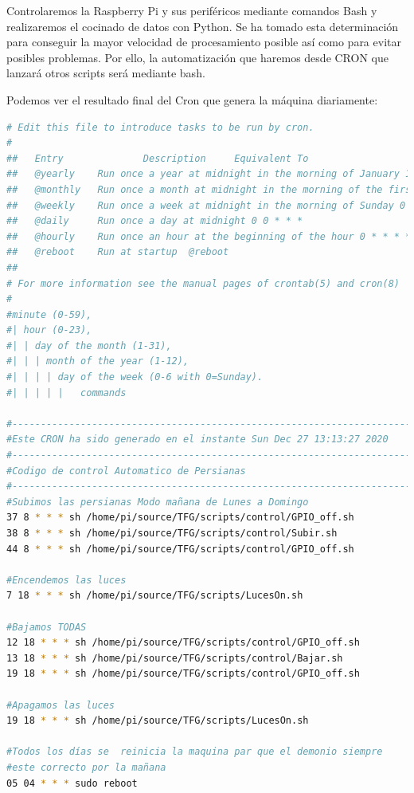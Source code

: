 Controlaremos la Raspberry Pi y sus periféricos mediante comandos Bash y realizaremos el cocinado de datos con Python. Se ha tomado esta determinación para conseguir la mayor velocidad de procesamiento posible así como para evitar posibles problemas. Por ello, la automatización que haremos desde CRON que lanzará otros scripts será mediante bash. 

Podemos ver el resultado final del Cron que genera la máquina diariamente:


\begin{lstlisting}[language=sh]
# Edit this file to introduce tasks to be run by cron.
# 
##   Entry              Description     Equivalent To
##   @yearly    Run once a year at midnight in the morning of January 1 0 0 1 1 *
##   @monthly   Run once a month at midnight in the morning of the first of the month 0 0 1 * *
##   @weekly    Run once a week at midnight in the morning of Sunday 0 0 * * 0
##   @daily     Run once a day at midnight 0 0 * * *
##   @hourly    Run once an hour at the beginning of the hour 0 * * * *
##   @reboot    Run at startup  @reboot
##   
# For more information see the manual pages of crontab(5) and cron(8)
# 
#minute (0-59),
#| hour (0-23),
#| | day of the month (1-31),
#| | | month of the year (1-12),
#| | | | day of the week (0-6 with 0=Sunday).
#| | | | |   commands

#--------------------------------------------------------------------------
#Este CRON ha sido generado en el instante Sun Dec 27 13:13:27 2020
#--------------------------------------------------------------------------
#Codigo de control Automatico de Persianas 
#--------------------------------------------------------------------------
#Subimos las persianas Modo mañana de Lunes a Domingo
37 8 * * * sh /home/pi/source/TFG/scripts/control/GPIO_off.sh
38 8 * * * sh /home/pi/source/TFG/scripts/control/Subir.sh
44 8 * * * sh /home/pi/source/TFG/scripts/control/GPIO_off.sh

#Encendemos las luces
7 18 * * * sh /home/pi/source/TFG/scripts/LucesOn.sh

#Bajamos TODAS
12 18 * * * sh /home/pi/source/TFG/scripts/control/GPIO_off.sh
13 18 * * * sh /home/pi/source/TFG/scripts/control/Bajar.sh
19 18 * * * sh /home/pi/source/TFG/scripts/control/GPIO_off.sh

#Apagamos las luces
19 18 * * * sh /home/pi/source/TFG/scripts/LucesOn.sh

#Todos los días se  reinicia la maquina par que el demonio siempre 
#este correcto por la mañana
05 04 * * * sudo reboot


\end{lstlisting}
